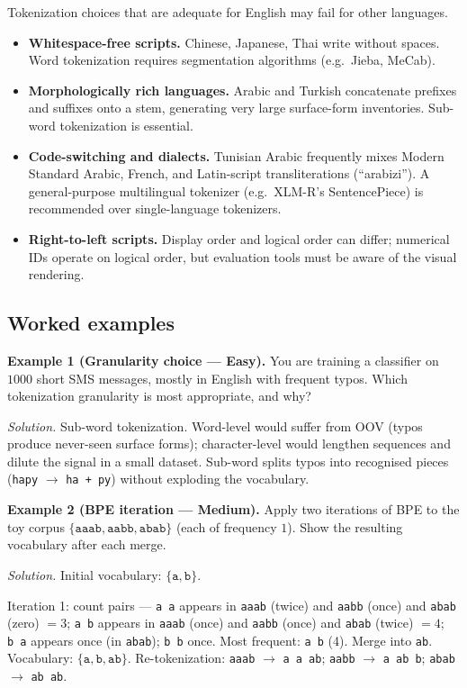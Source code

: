 Tokenization choices that are adequate for English may fail for other languages.

\begin{itemize}
    \item \textbf{Whitespace-free scripts.} Chinese, Japanese, Thai write without spaces. Word tokenization requires segmentation algorithms (e.g.\ Jieba, MeCab).
    \item \textbf{Morphologically rich languages.} Arabic and Turkish concatenate prefixes and suffixes onto a stem, generating very large surface-form inventories. Sub-word tokenization is essential.
    \item \textbf{Code-switching and dialects.} Tunisian Arabic frequently mixes Modern Standard Arabic, French, and Latin-script transliterations (``arabizi''). A general-purpose multilingual tokenizer (e.g.\ XLM-R's SentencePiece) is recommended over single-language tokenizers.
    \item \textbf{Right-to-left scripts.} Display order and logical order can differ; numerical IDs operate on logical order, but evaluation tools must be aware of the visual rendering.
\end{itemize}

\subsection{Worked examples}

\textbf{Example 1 (Granularity choice --- Easy).}
You are training a classifier on $1000$ short SMS messages, mostly in English with frequent typos. Which tokenization granularity is most appropriate, and why?

\textit{Solution.} Sub-word tokenization. Word-level would suffer from OOV (typos produce never-seen surface forms); character-level would lengthen sequences and dilute the signal in a small dataset. Sub-word splits typos into recognised pieces (\texttt{hapy} $\to$ \texttt{ha + py}) without exploding the vocabulary.

\medskip

\textbf{Example 2 (BPE iteration --- Medium).}
Apply two iterations of BPE to the toy corpus $\{\texttt{aaab}, \texttt{aabb}, \texttt{abab}\}$ (each of frequency $1$). Show the resulting vocabulary after each merge.

\textit{Solution.} Initial vocabulary: $\{\texttt{a}, \texttt{b}\}$.

Iteration 1: count pairs --- \texttt{a\,a} appears in \texttt{aaab} (twice) and \texttt{aabb} (once) and \texttt{abab} (zero) $= 3$; \texttt{a\,b} appears in \texttt{aaab} (once) and \texttt{aabb} (once) and \texttt{abab} (twice) $= 4$; \texttt{b\,a} appears once (in \texttt{abab}); \texttt{b\,b} once.
Most frequent: \texttt{a\,b} (4). Merge into \texttt{ab}. Vocabulary: $\{\texttt{a}, \texttt{b}, \texttt{ab}\}$. Re-tokenization: \texttt{aaab} $\to$ \texttt{a\,a\,ab}; \texttt{aabb} $\to$ \texttt{a\,ab\,b}; \texttt{abab} $\to$ \texttt{ab\,ab}.

